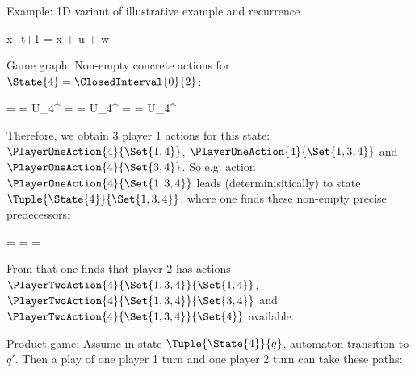 Example: 1D variant of illustrative example and recurrence

\startformula
    x_{t+1} = x + u + w
\stopformula

Game graph:
Non-empty concrete actions for $\State{4} = \ClosedInterval{0}{2}$:

\startformula
    \startalign[n=3,align={left,left,left}]
        \NC {}
        \NC = 
        \NC = U_4^ \EndComma
        \NR
        \NC {}
        \NC = 
        \NC = U_4^ \EndComma
        \NR
        \NC {}
        \NC = 
        \NC = U_4^ \EndPeriod
        \NR
    \stopalign
\stopformula

Therefore, we obtain 3 player 1 actions for this state: $\PlayerOneAction{4}{\Set{1, 4}}$, $\PlayerOneAction{4}{\Set{1, 3, 4}}$ and $\PlayerOneAction{4}{\Set{3, 4}}$.
So e.g. action $\PlayerOneAction{4}{\Set{1, 3, 4}}$ leads (determinisitically) to state $\Tuple{\State{4}}{\Set{1, 3, 4}}$, where one finds these non-empty precise predecessors:

\startformula
    \startalign[n=2,align={left,left}]
        \NC {}
        \NC = 
        \NR
        \NC {}
        \NC = 
        \NR
        \NC {}
        \NC = 
        \NR
    \stopalign
\stopformula

From that one finds that player 2 has actions $\PlayerTwoAction{4}{\Set{1, 3, 4}}{\Set{1, 4}}$, $\PlayerTwoAction{4}{\Set{1, 3, 4}}{\Set{3, 4}}$ and $\PlayerTwoAction{4}{\Set{1, 3, 4}}{\Set{4}}$ available.

Product game:
Assume in state $\Tuple{\State{4}}{q}$, automaton transition to $q'$.
Then a play of one player 1 turn and one player 2 turn can take these paths:


